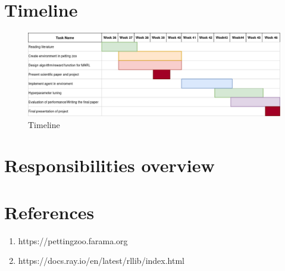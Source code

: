 \documentclass{article}
\begin{document}
\section{Timeline}
\begin{figure}[h]
    \begin{center}
        \includegraphics[width=\textwidth]{Timeline.png}
    \end{center}
    \caption{Timeline}
    \label{fig:}
\end{figure}


\section{Responsibilities overview}


\section*{References}
\begin{enumerate}
  \item https://pettingzoo.farama.org
  \item https://docs.ray.io/en/latest/rllib/index.html
\end{enumerate}
\end{document}
